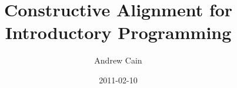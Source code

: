 \title{Constructive Alignment for Introductory Programming}
\author{Andrew Cain}

\date{2011-02-10}

\maketitle